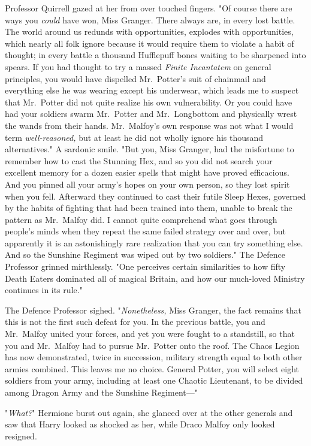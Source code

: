 Professor Quirrell gazed at her from over touched fingers. "Of course there are
ways you \emph{could} have won, Miss Granger. There always are, in every lost
battle. The world around us redunds with opportunities, explodes with
opportunities, which nearly all folk ignore because it would require them to
violate a habit of thought; in every battle a thousand Hufflepuff bones waiting
to be sharpened into spears. If you had thought to try a massed \emph{Finite
Incantatem} on general principles, you would have dispelled Mr.~Potter's suit
of chainmail and everything else he was wearing except his underwear, which
leads me to suspect that Mr.~Potter did not quite realize his own
vulnerability. Or you could have had your soldiers swarm Mr.~Potter and
Mr.~Longbottom and physically wrest the wands from their hands. Mr.~Malfoy's
own response was not what I would term \emph{well-reasoned,} but at least he
did not wholly ignore his thousand alternatives." A sardonic smile. "But you,
Miss Granger, had the misfortune to remember how to cast the Stunning Hex, and
so you did not search your excellent memory for a dozen easier spells that
might have proved efficacious. And you pinned all your army's hopes on your own
person, so they lost spirit when you fell. Afterward they continued to cast
their futile Sleep Hexes, governed by the habits of fighting that had been
trained into them, unable to break the pattern as Mr.~Malfoy did. I cannot
quite comprehend what goes through people's minds when they repeat the same
failed strategy over and over, but apparently it is an astonishingly rare
realization that you can try something else. And so the Sunshine Regiment was
wiped out by two soldiers." The Defence Professor grinned mirthlessly. "One
perceives certain similarities to how fifty Death Eaters dominated all of
magical Britain, and how our much-loved Ministry continues in its rule."

The Defence Professor sighed. "\emph{Nonetheless,} Miss Granger, the fact
remains that this is not the first such defeat for you. In the previous battle,
you and Mr.~Malfoy united your forces, and yet you were fought to a standstill,
so that you and Mr.~Malfoy had to pursue Mr.~Potter onto the roof. The Chaos
Legion has now demonstrated, twice in succession, military strength equal to
both other armies combined. This leaves me no choice. General Potter, you will
select eight soldiers from your army, including at least one Chaotic
Lieutenant, to be divided among Dragon Army and the Sunshine Regiment---"

"\emph{What?}" Hermione burst out again, she glanced over at the other generals
and saw that Harry looked as shocked as her, while Draco Malfoy only looked
resigned.

